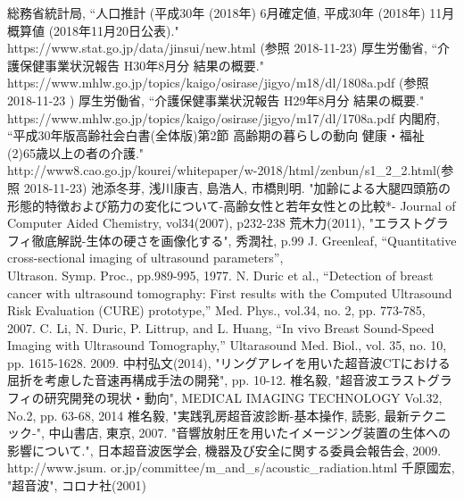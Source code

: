 \begin{thebibliography}{9}
   総務省統計局, 
    ``人口推計 (平成30年 (2018年) 6月確定値, 平成30年 (2018年) 11月概算値 (2018年11月20日公表)." \\https://www.stat.go.jp/data/jinsui/new.html  (参照 2018-11-23)
   厚生労働省,
    ``介護保健事業状況報告 H30年8月分 結果の概要." \\https://www.mhlw.go.jp/topics/kaigo/osirase/jigyo/m18/dl/1808a.pdf  (参照 2018-11-23 )
    厚生労働省,
    ``介護保健事業状況報告 H29年8月分 結果の概要." \\https://www.mhlw.go.jp/topics/kaigo/osirase/jigyo/m17/dl/1708a.pdf
     内閣府,
    ``平成30年版高齢社会白書(全体版)第2節 高齢期の暮らしの動向 健康・福祉 (2)65歳以上の者の介護."\\http://www8.cao.go.jp/kourei/whitepaper/w-2018/html/zenbun/s1\_2\_2.html(参照
    2018-11-23)
     池添冬芽, 浅川康吉, 島浩人, 市橋則明.
    "加齢による大腿四頭筋の形態的特徴および筋力の変化について-高齢女性と若年女性との比較*- Journal of Computer Aided Chemistry, vol34(2007), p232-238
      荒木力(2011), 
    "エラストグラフィ徹底解説-生体の硬さを画像化する", 秀潤社, p.99
     J. Greenleaf, 
    “Quantitative cross-sectional imaging of ultrasound parameters”, \\Ultrason. Symp. Proc., 
    pp.989-995, 1977.
     N. Duric et al.,
     “Detection of breast cancer with ultrasound tomography: First results with the Computed Ultrasound Risk Evaluation (CURE) prototype,” Med. Phys., vol.34, no. 2, pp. 773-785, 2007.
      C. Li, N. Duric, P. Littrup, and L. Huang, 
     “In vivo Breast Sound-Speed Imaging with Ultrasound Tomography,” Ultarasound Med. Biol., vol. 35, no. 10, pp. 1615-1628. 2009.
      中村弘文(2014), 
     "リングアレイを用いた超音波CTにおける屈折を考慮した音速再構成手法の開発", pp. 10-12.
      椎名毅,
     "超音波エラストグラフィの研究開発の現状・動向", MEDICAL IMAGING TECHNOLOGY Vol.32, No.2, pp. 63-68, 2014
      椎名毅,
     "実践乳房超音波診断-基本操作, 読影, 最新テクニック-", 中山書店, 東京, 2007.
     "音響放射圧を用いたイメージング装置の生体への影響について.", 日本超音波医学会, 機器及び安全に関する委員会報告会, 2009. \\http://www.jsum. or.jp/committee/m\_and\_s/acoustic\_radiation.html
      千原國宏,     
     "超音波", コロナ社(2001)
\end{thebibliography}